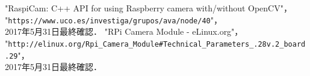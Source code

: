 \documentclass[11pt,a4paper]{jsarticle}
\begin{document}
\begin{thebibliography}{9}
    "RaspiCam: C++ API for using Raspberry camera with/without OpenCV"，\\
    "\texttt{https://www.uco.es/investiga/grupos/ava/node/40}"，\\
    2017年5月31日最終確認．
    "RPi Camera Module - eLinux.org"，\\
    "\texttt{http://elinux.org/Rpi\_Camera\_Module\#Technical\_Parameters\_.28v.2\_board.29}"，\\
    2017年5月31日最終確認．
\end{thebibliography}
\end{document}
